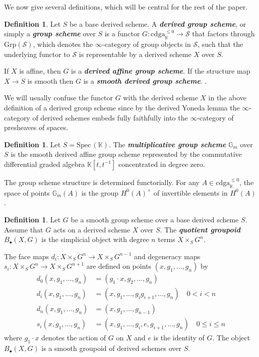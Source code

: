 \documentclass[reqno]{amsart}
\theoremstyle{definition}
\newtheorem{definition}[theorem]{Definition}
\theoremstyle{remark}
\newcommand{\K}{\mathbb{K}}
\newcommand{\Spec}{\mathrm{Spec\,}}
\newcommand{\bfem}[1]{\textbf{\textit{#1}}}
\begin{document}
We now give several definitions, which will be central for the rest of the paper.
\begin{definition}
  \label{def:derived_group_scheme}
  Let $S$ be a base derived scheme. A \bfem{derived group scheme}, or simply a \bfem{group scheme} over $S$ is a functor $G \colon \mathrm{cdga}_{\mathbb{K}}^{\leq 0} \to \mathcal{S}$ that factors through $\mathrm{Grp}(\mathcal{S})$, which denotes the $\infty$-category of group objects in $\mathcal{S}$, such that the underlying functor to $\mathcal{S}$ is representable by a derived scheme $X$ over $S$. 
  
  If $X$ is affine, then $G$ is a \bfem{derived affine group scheme}. If the structure map $X\to S$ is smooth then $G$ is a \bfem{smooth derived group scheme}. \cite[adapted from App. A.2]{Iwanari}.
\end{definition}

We will usually confuse the functor $G$ with the derived scheme $X$ in the above definition of a derived group scheme since by the derived Yoneda lemma the $\infty$-category of derived schemes embeds fully faithfully into the $\infty$-category of presheaves of spaces. 

\begin{definition}
  \label{def:multiplicative_group}
  Let $S = \Spec(\K)$. The \bfem{multiplicative group scheme} $\mathbb{G}_m$ over $S$ is the smooth derived affine group scheme represented by the commutative differential graded algebra $\K[t, t^{-1}]$ concentrated in degree zero. 
  
  The group scheme structure is determined functorially. For any $A \in \mathrm{cdga}_{\K}^{\leq 0}$, the space of points $\mathbb{G}_m(A)$ is the group $H^0(A)^\times$ of invertible elements in $H^0(A)$ \cite[adapted from Section 1.2]{Waterhouse}.
\end{definition}

\begin{definition}
  \label{def:quotient_groupoid}
  Let $G$ be a smooth group scheme over a base derived scheme $S$. Assume that $G$ acts on a derived scheme $X$ over $S$. The \bfem{quotient groupoid} $B_\bullet(X, G)$ is the simplicial object with degree $n$ terms $X \times_S G^n$. 
  
  The face maps $d_i \colon X \times_S G^n \to X \times_S G^{n-1}$ and degeneracy maps $s_i \colon X \times_S G^n \to X \times_S G^{n+1}$ are defined on points $(x, g_1, \dots, g_n)$ by
  \begin{align*}
    d_0(x, g_1, \dots, g_n) &= (g_1 \cdot x, g_2, \dots, g_n) \\
    d_i(x, g_1, \dots, g_n) &= (x, g_1, \dots, g_i g_{i+1}, \dots, g_n) \quad 0 < i < n \\
    d_n(x, g_1, \dots, g_n) &= (x, g_1, \dots, g_{n-1}) \\
    s_i(x, g_1, \dots, g_n) &= (x, g_1, \dots, g_i, e, g_{i+1}, \dots, g_n) \quad 0 \leq i \leq n
  \end{align*}
  where $g_1 \cdot x$ denotes the action of $G$ on $X$ and $e$ is the identity of $G$. The object $B_\bullet(X, G)$ is a smooth groupoid of derived schemes over $S$.
\end{definition}
\end{document}

